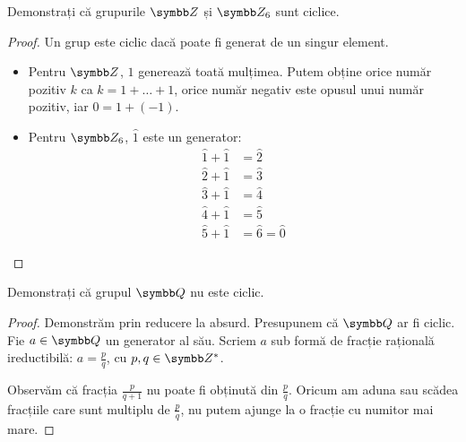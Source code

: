 \begin{exercise}
Demonstrați că grupurile \(\integers\) și \(\integersmod{6}\) sunt ciclice.
\end{exercise}
\begin{proof}
Un grup este ciclic dacă poate fi generat de un singur element.

\begin{itemize}
    \item Pentru \(\integers\), \(1\) generează toată mulțimea. Putem obține orice număr pozitiv \(k\) ca \(k = 1 + \dots + 1\), orice număr negativ este opusul unui număr pozitiv,  iar \(0 = 1 + (-1)\).
    \item Pentru \(\integersmod{6}\), \(\widehat{1}\) este un generator:
    \begin{align*}
        \widehat{1} + \widehat{1} &= \widehat{2} \\
        \widehat{2} + \widehat{1} &= \widehat{3} \\
        \widehat{3} + \widehat{1} &= \widehat{4} \\
        \widehat{4} + \widehat{1} &= \widehat{5} \\
        \widehat{5} + \widehat{1} &= \widehat{6} = \widehat{0}
    \end{align*}
\end{itemize}
\end{proof}

\begin{exercise}
Demonstrați că grupul \(\rationals\) nu este ciclic.
\end{exercise}
\begin{proof}
Demonstrăm prin reducere la absurd. Presupunem că \(\rationals\) ar fi ciclic. Fie \(a \in \rationals\) un generator al său. Scriem \(a\) sub formă de fracție rațională ireductibilă: \(a = \frac{p}{q}\), cu \(p, q \in \integers^*\).

Observăm că fracția \(\frac{p}{q + 1}\) nu poate fi obținută din \(\frac{p}{q}\). Oricum am aduna sau scădea fracțiile care sunt multiplu de \(\frac{p}{q}\), nu putem ajunge la o fracție cu numitor mai mare.
\end{proof}

